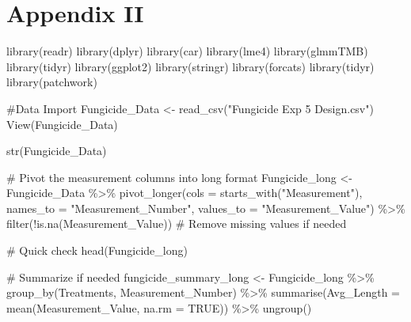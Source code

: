 \documentclass[
  10pt,
  letterpaper,
  twocolumn]{article}
\newenvironment{Shaded}{\begin{snugshade}}{\end{snugshade}}
\newcommand{\AttributeTok}[1]{\textcolor[rgb]{0.40,0.45,0.13}{#1}}
\newcommand{\CommentTok}[1]{\textcolor[rgb]{0.37,0.37,0.37}{#1}}
\newcommand{\ConstantTok}[1]{\textcolor[rgb]{0.56,0.35,0.01}{#1}}
\newcommand{\FunctionTok}[1]{\textcolor[rgb]{0.28,0.35,0.67}{#1}}
\newcommand{\NormalTok}[1]{\textcolor[rgb]{0.00,0.23,0.31}{#1}}
\newcommand{\OtherTok}[1]{\textcolor[rgb]{0.00,0.23,0.31}{#1}}
\newcommand{\SpecialCharTok}[1]{\textcolor[rgb]{0.37,0.37,0.37}{#1}}
\newcommand{\StringTok}[1]{\textcolor[rgb]{0.13,0.47,0.30}{#1}}
\begin{document}
\clearpage
\nocite{*}
\onecolumn
\section*{Appendix II}
\scriptsize

\begin{Shaded}
\begin{Highlighting}[]
\FunctionTok{library}\NormalTok{(readr)}
\FunctionTok{library}\NormalTok{(dplyr)}
\FunctionTok{library}\NormalTok{(car)}
\FunctionTok{library}\NormalTok{(lme4)}
\FunctionTok{library}\NormalTok{(glmmTMB)}
\FunctionTok{library}\NormalTok{(tidyr)}
\FunctionTok{library}\NormalTok{(ggplot2)}
\FunctionTok{library}\NormalTok{(stringr)}
\FunctionTok{library}\NormalTok{(forcats)}
\FunctionTok{library}\NormalTok{(tidyr)}
\FunctionTok{library}\NormalTok{(patchwork)}

\CommentTok{\#Data Import}
\NormalTok{Fungicide\_Data }\OtherTok{\textless{}{-}} \FunctionTok{read\_csv}\NormalTok{(}\StringTok{"Fungicide Exp 5 Design.csv"}\NormalTok{)}
\FunctionTok{View}\NormalTok{(Fungicide\_Data)}

\FunctionTok{str}\NormalTok{(Fungicide\_Data)}


\CommentTok{\# Pivot the measurement columns into long format}
\NormalTok{Fungicide\_long }\OtherTok{\textless{}{-}}\NormalTok{ Fungicide\_Data }\SpecialCharTok{\%\textgreater{}\%}
  \FunctionTok{pivot\_longer}\NormalTok{(}\AttributeTok{cols =} \FunctionTok{starts\_with}\NormalTok{(}\StringTok{"Measurement"}\NormalTok{), }
               \AttributeTok{names\_to =} \StringTok{"Measurement\_Number"}\NormalTok{, }
               \AttributeTok{values\_to =} \StringTok{"Measurement\_Value"}\NormalTok{) }\SpecialCharTok{\%\textgreater{}\%}
  \FunctionTok{filter}\NormalTok{(}\SpecialCharTok{!}\FunctionTok{is.na}\NormalTok{(Measurement\_Value))  }\CommentTok{\# Remove missing values if needed}

\CommentTok{\# Quick check}
\FunctionTok{head}\NormalTok{(Fungicide\_long)}


\CommentTok{\# Summarize if needed}
\NormalTok{fungicide\_summary\_long }\OtherTok{\textless{}{-}}\NormalTok{ Fungicide\_long }\SpecialCharTok{\%\textgreater{}\%}
  \FunctionTok{group\_by}\NormalTok{(Treatments, Measurement\_Number) }\SpecialCharTok{\%\textgreater{}\%}
  \FunctionTok{summarise}\NormalTok{(}\AttributeTok{Avg\_Length =} \FunctionTok{mean}\NormalTok{(Measurement\_Value, }\AttributeTok{na.rm =} \ConstantTok{TRUE}\NormalTok{)) }\SpecialCharTok{\%\textgreater{}\%}
  \FunctionTok{ungroup}\NormalTok{()}


\end{Highlighting}
\end{Shaded}
\end{document}
